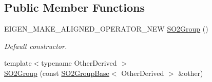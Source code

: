 \subsection*{Public Member Functions}
\begin{DoxyCompactItemize}
\item 
E\+I\+G\+E\+N\+\_\+\+M\+A\+K\+E\+\_\+\+A\+L\+I\+G\+N\+E\+D\+\_\+\+O\+P\+E\+R\+A\+T\+O\+R\+\_\+\+N\+EW \hyperlink{class_sophus_1_1_s_o2_group_a3d4158ae5cff1041b6b59822458d3936}{S\+O2\+Group} ()
\begin{DoxyCompactList}\small\item\em Default constructor. \end{DoxyCompactList}\item 
{\footnotesize template$<$typename Other\+Derived $>$ }\\\hyperlink{class_sophus_1_1_s_o2_group_a746020eda456033f97eec4df2068ed5e}{S\+O2\+Group} (const \hyperlink{class_sophus_1_1_s_o2_group_base}{S\+O2\+Group\+Base}$<$ Other\+Derived $>$ \&other)\hypertarget{class_sophus_1_1_s_o2_group_a746020eda456033f97eec4df2068ed5e}{}\label{class_sophus_1_1_s_o2_group_a746020eda456033f97eec4df2068ed5e}


\end{DoxyCompactItemize}
